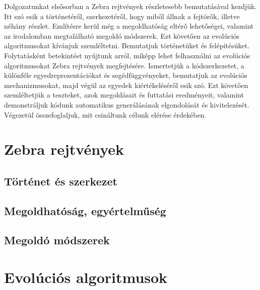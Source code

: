 \documentclass[12ppt,a4paper,oneside]{report}
\begin{document}
	Dolgozatunkat elsősorban a Zebra rejtvények részletesebb bemutatásával kezdjük.
    Itt szó esik a történetéről, szerkezetéről, hogy miből állnak a fejtörők, illetve néhány részlet.
    Említésre kerül még a megoldhatóság eltérő lehetőségei, valamint az irodalomban megtalálható megoldó módszerek. Ezt követően az evolúciós algoritmusokat kívánjuk szemléltetni.
    Bemutatjuk történetüket és felépítésüket.
    Folytatásként betekintést nyújtunk arról, miképp lehet felhasználni az evolúciós algoritmusokat Zebra rejtvények megfejtésére.
    Ismertetjük a kódszerkezetet, a különféle egyedreprezentációkat és segédfüggvényeket, bemutatjuk az evolúciós mechanizmusokat, majd végül az egyedek kiértékeléséről esik szó.
    Ezt követően szemléltetjük a teszteket, azok megoldásait és futtatási eredményeit, valamint demonstráljuk kódunk automatikus generálásának elgondolását és kivitelezését.
    Végezetül összefoglaljuk, mit csináltunk célunk elérése érdekében.

\chapter{Zebra rejtvények} %
    
    \section{Történet és szerkezet} %

    \section{Megoldhatóság, egyértelműség} %

    \section{Megoldó módszerek} %

\chapter{Evolúciós algoritmusok} %
\end{document}
